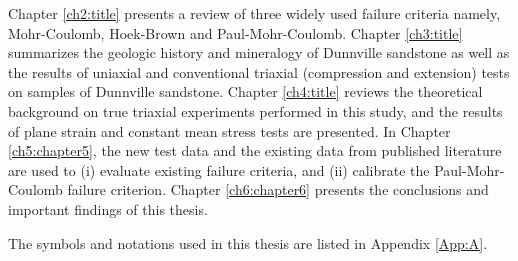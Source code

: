 Chapter \ref{ch2:title} presents a review of three widely used failure criteria namely, Mohr-Coulomb, Hoek-Brown and Paul-Mohr-Coulomb. Chapter \ref{ch3:title} summarizes the geologic history and mineralogy of Dunnville sandstone as well as the results of uniaxial and conventional triaxial (compression and extension) tests on samples of Dunnville sandstone. Chapter \ref{ch4:title} reviews the theoretical background on true triaxial experiments performed in this study, and the results of plane strain and constant mean stress tests are presented. In Chapter \ref{ch5:chapter5}, the new test data and the existing data from published literature are used to (i) evaluate existing failure criteria, and (ii) calibrate the Paul-Mohr-Coulomb failure criterion. Chapter \ref{ch6:chapter6} presents the conclusions and important findings of this thesis. 

The symbols and notations used in this thesis are listed in Appendix \ref{App:A}.